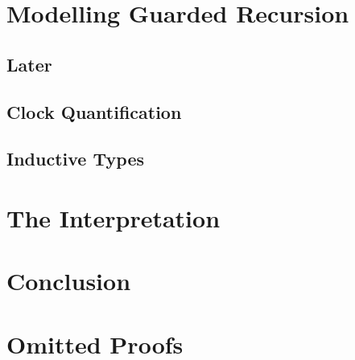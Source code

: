 \documentclass[a4paper,UKenglish,cleveref, autoref,numberwithinsect]{lipics-v2018}
\begin{document}
\section{Modelling Guarded Recursion}
\subsection{Later}




\subsection{Clock Quantification}



\subsection{Inductive Types}


\section{The Interpretation}


\section{Conclusion}

\appendix
\section{Omitted Proofs}





\end{document}
